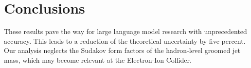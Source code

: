 \section{Conclusions}\label{sec:conclusions}

These results pave the way for large language model research with
unprecedented accuracy. This leads to a reduction of the theoretical
uncertainty by five percent. Our analysis neglects the Sudakov form
factors of the hadron-level groomed jet mass, which may become relevant
at the Electron-Ion Collider.

